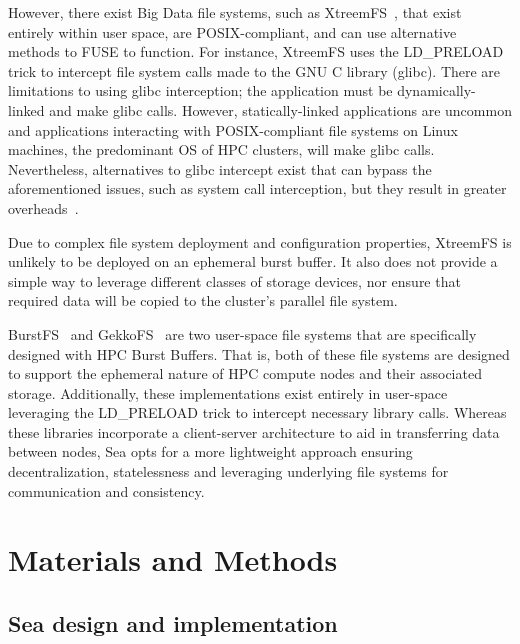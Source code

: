 \documentclass[10pt,journal,compsoc]{IEEEtran}
\begin{document}
      However, there exist Big Data file systems, such as
      XtreemFS~\cite{xtreemfs}, that exist entirely within user space, are
      POSIX-compliant, and can use alternative methods to FUSE to function. For
      instance, XtreemFS uses the LD\_PRELOAD trick to intercept file system
      calls made to the GNU C library (glibc). There are limitations to using
      glibc interception; the application must be dynamically-linked and make
      glibc calls. However, statically-linked applications are uncommon and
      applications interacting with POSIX-compliant file systems on Linux
      machines, the predominant OS of HPC clusters, will make glibc calls.
      Nevertheless, alternatives to glibc intercept exist that can bypass
      the aforementioned issues, such as system call interception, but they
      result in greater overheads~\cite{quinson}.

      Due to complex file system deployment and configuration properties,
      XtreemFS is unlikely to be deployed on an ephemeral burst buffer. It also
      does not provide a simple way to leverage different classes of storage
      devices, nor ensure that required data will be copied to the cluster's
      parallel file system.

      BurstFS~\cite{burstfs} and GekkoFS~\cite{gekkofs} are two user-space file
      systems that are specifically designed with HPC Burst Buffers. That is, both of
      these file systems are designed to support the ephemeral nature of HPC compute nodes and their associated storage.
      Additionally, these implementations exist entirely in user-space leveraging the LD\_PRELOAD trick to intercept
      necessary library calls. Whereas these libraries incorporate a client-server architecture to aid in transferring data
      between nodes, Sea opts for a more lightweight approach ensuring decentralization, statelessness and leveraging underlying
      file systems for communication and consistency.

\section{Materials and Methods}

\subsection{Sea design and implementation}
\end{document}
